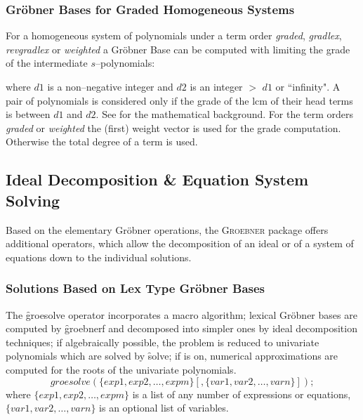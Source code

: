 \subsubsection{Gr\"obner Bases for Graded Homogeneous Systems}

For a homogeneous system of polynomials under a term order
{\it graded}, {\it gradlex}, {\it revgradlex} or {\it weighted}
a Gr\"obner Base can be computed with limiting the grade
of the intermediate $s$--polynomials:
\begin{description}
\item[\f{dd\_groebner}($d1,d2,\{p_1,p_2,\ldots\}$);]
  \hypertarget{operator:DD_GROEBNER}{}
\end{description}
where $d1$ is a non--negative integer and $d2$ is an integer
$>$ $d1$ or ``infinity". A pair of polynomials is considered
only if the grade of the lcm of their head terms is between
$d1$ and $d2$. See \cite{Becker:93} for the mathematical background.
For the term orders {\it graded} or {\it weighted} the (first) weight
vector is used for the grade computation. Otherwise the total
degree of a term is used.

\subsection{Ideal Decomposition \& Equation System Solving}
Based on the elementary Gr\"obner operations, the \textsc{Groebner} package offers
additional operators, which allow the decomposition of an ideal or of a
system of equations down to the individual solutions.

\subsubsection{Solutions Based on Lex Type Gr\"obner Bases}

 
\hypertarget{operator:GROESOLVE}{}
The \f{groesolve} operator incorporates a macro algorithm;
lexical Gr\"obner bases are computed by \f{groebnerf} and decomposed
into simpler ones by ideal decomposition techniques; if algebraically
possible, the problem is reduced to univariate polynomials which are
solved by \f{solve}; if  is on, numerical approximations are
computed for the roots of the univariate polynomials.
\[
 groesolve(\{exp1, exp2, \ldots , expm\}[,\{var1, var2, \ldots ,
varn\}]); \]
where $\{exp1, exp2,\ldots , expm\}$ is a list of any number of
expressions or equations, $\{var1, var2, \ldots , varn\}$ is an
optional list of variables.


